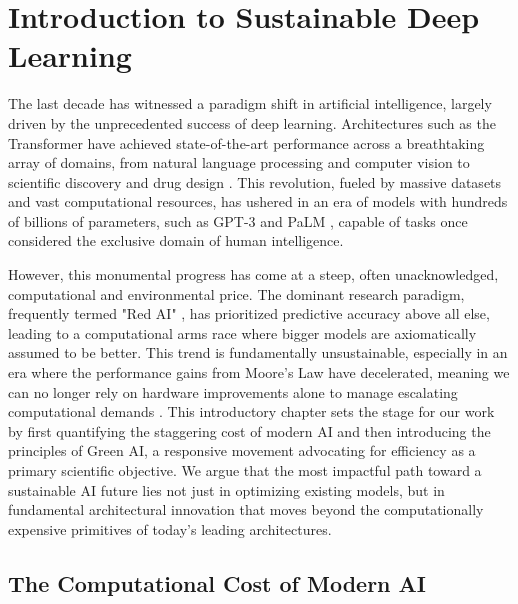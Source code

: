 \documentclass[12pt, a4paper]{article}
\begin{document}

\section{Introduction to Sustainable Deep Learning}
\label{sec:introduction}

The last decade has witnessed a paradigm shift in artificial intelligence, largely driven by the unprecedented success of deep learning. Architectures such as the Transformer \cite{vaswani2017attention} have achieved state-of-the-art performance across a breathtaking array of domains, from natural language processing and computer vision to scientific discovery and drug design \cite{jumper2021highly}. This revolution, fueled by massive datasets and vast computational resources, has ushered in an era of models with hundreds of billions of parameters, such as GPT-3 \cite{brown2020language} and PaLM \cite{chowdhery2022palm}, capable of tasks once considered the exclusive domain of human intelligence.

However, this monumental progress has come at a steep, often unacknowledged, computational and environmental price. The dominant research paradigm, frequently termed "Red AI" \cite{schwartz2020green}, has prioritized predictive accuracy above all else, leading to a computational arms race where bigger models are axiomatically assumed to be better. This trend is fundamentally unsustainable, especially in an era where the performance gains from Moore's Law have decelerated, meaning we can no longer rely on hardware improvements alone to manage escalating computational demands \cite{hennessy2019new}. This introductory chapter sets the stage for our work by first quantifying the staggering cost of modern AI and then introducing the principles of Green AI, a responsive movement advocating for efficiency as a primary scientific objective. We argue that the most impactful path toward a sustainable AI future lies not just in optimizing existing models, but in fundamental architectural innovation that moves beyond the computationally expensive primitives of today's leading architectures.

\subsection{The Computational Cost of Modern AI}
\label{ssec:computational_cost}
\end{document}
